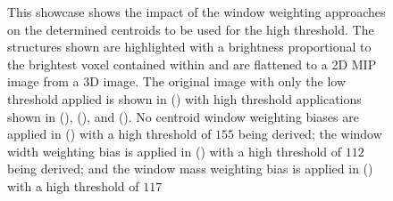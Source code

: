 \begin{figure}
    \caption[This showcase shows the impact of the window weighting approaches on the determined centroids to be used for the high threshold]{This showcase shows the impact of the window weighting approaches on the determined centroids to be used for the high threshold. The structures shown are highlighted with a brightness proportional to the brightest voxel contained within and are flattened to a 2D MIP image from a 3D image. The original image with only the low threshold applied is shown in () with high threshold applications shown in (), (), and (). No centroid window weighting biases are applied in () with a high threshold of $155$ being derived; the window width weighting bias is applied in () with a high threshold of $112$ being derived; and the window mass weighting bias is applied in () with a high threshold of $117$}
    \label{fig:window_mips}
\end{figure}


